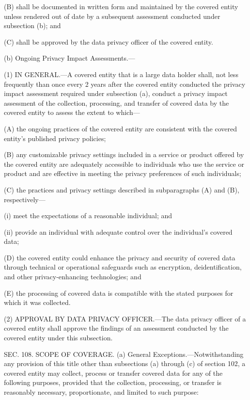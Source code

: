 (B) shall be documented in written form and maintained by the covered entity unless rendered out of date by a subsequent assessment conducted under subsection (b); and

(C) shall be approved by the data privacy officer of the covered entity.

(b) Ongoing Privacy Impact Assessments.—

(1) IN GENERAL.—A covered entity that is a large data holder shall, not less frequently than once every 2 years after the covered entity conducted the privacy impact assessment required under subsection (a), conduct a privacy impact assessment of the collection, processing, and transfer of covered data by the covered entity to assess the extent to which—

(A) the ongoing practices of the covered entity are consistent with the covered entity's published privacy policies;

(B) any customizable privacy settings included in a service or product offered by the covered entity are adequately accessible to individuals who use the service or product and are effective in meeting the privacy preferences of such individuals;

(C) the practices and privacy settings described in subparagraphs (A) and (B), respectively—

(i) meet the expectations of a reasonable individual; and

(ii) provide an individual with adequate control over the individual's covered data;

(D) the covered entity could enhance the privacy and security of covered data through technical or operational safeguards such as encryption, deidentification, and other privacy-enhancing technologies; and

(E) the processing of covered data is compatible with the stated purposes for which it was collected.

(2) APPROVAL BY DATA PRIVACY OFFICER.—The data privacy officer of a covered entity shall approve the findings of an assessment conducted by the covered entity under this subsection.


SEC. 108. SCOPE OF COVERAGE.
(a) General Exceptions.—Notwithstanding any provision of this title other than subsections (a) through (c) of section 102, a covered entity may collect, process or transfer covered data for any of the following purposes, provided that the collection, processing, or transfer is reasonably necessary, proportionate, and limited to such purpose:

